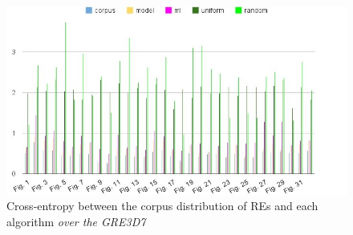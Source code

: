 \begin{landscape}

\begin{figure}[h!]
\begin{center}
\includegraphics[width=1.2\textwidth]{images/entropyComplete.jpg}
\end{center}
\vspace*{-2em}
\caption{Cross-entropy between the corpus distribution of REs and each algorithm \textit{over the GRE3D7}}\label{Entropy}
\end{figure}


\end{landscape}


